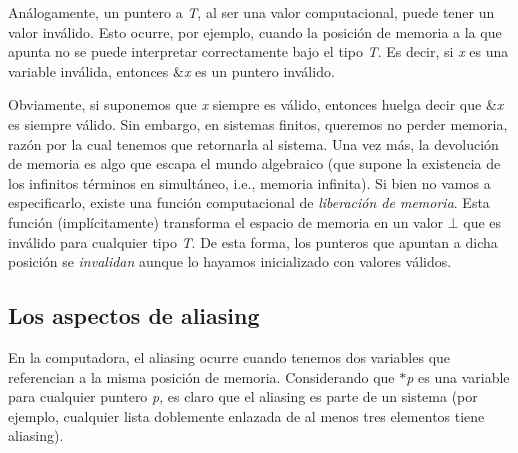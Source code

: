 \-Análogamente, un puntero a {\itshape \-T\/}, al ser una valor computacional, puede tener un valor inválido. \-Esto ocurre, por ejemplo, cuando la posición de memoria a la que apunta no se puede interpretar correctamente bajo el tipo {\itshape \-T\/}. \-Es decir, si {\itshape x\/} es una variable inválida, entonces \&{\itshape x\/} es un puntero inválido.

\-Obviamente, si suponemos que {\itshape x\/} siempre es válido, entonces huelga decir que \&{\itshape x\/} es siempre válido. \-Sin embargo, en sistemas finitos, queremos no perder memoria, razón por la cual tenemos que retornarla al sistema. \-Una vez más, la devolución de memoria es algo que escapa el mundo algebraico (que supone la existencia de los infinitos términos en simultáneo, i.\-e., memoria infinita). \-Si bien no vamos a especificarlo, existe una función computacional de {\itshape liberación de memoria\/}. \-Esta función (implícitamente) transforma el espacio de memoria en un valor $\bot$ que es inválido para cualquier tipo {\itshape \-T\/}. \-De esta forma, los punteros que apuntan a dicha posición se {\itshape invalidan\/} aunque lo hayamos inicializado con valores válidos.\hypertarget{Aliasing_sec-aliasing}{}\subsection{\-Los aspectos de aliasing}\label{Aliasing_sec-aliasing}
\-En la computadora, el aliasing ocurre cuando tenemos dos variables que referencian a la misma posición de memoria. \-Considerando que $\ast${\itshape p\/} es una variable para cualquier puntero {\itshape p\/}, es claro que el aliasing es parte de un sistema (por ejemplo, cualquier lista doblemente enlazada de al menos tres elementos tiene aliasing).

